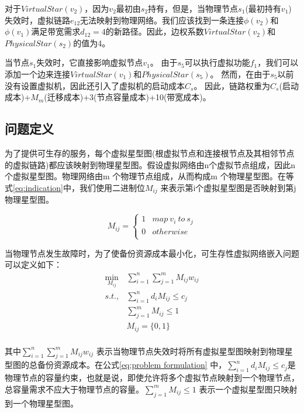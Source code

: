 对于$VirtualStar(v_2)$，因为$v_2$最初由$s_2$持有，但是，当物理节点$s_1$(最初持有$v_1$)失效时，虚拟链路$e_{12}$无法映射到物理网络。我们应该找到一条连接$\phi(v_2)$和$\phi(v_1)$满足带宽需求$d_{12}=4$的新路径。因此，边权系数$VirtualStar(v_2)$和$PhysicalStar(s_2)$的值为4。

当节点$s_1$失效时，它直接影响虚拟节点$v_1$。 由于$s_5$可以执行虚拟功能$f_1$，我们可以添加一个边来连接$VirtualStar(v_1)$和$PhysicalStar(s_5)$。 然而，在由于$s_5$以前没有设置虚拟机，因此还引入了虚拟机的启动成本$C_s$。 因此，链路权重为$C_s$(启动成本)+$M_m$(迁移成本)+3(节点容量成本)+10(带宽成本)。

\subsection{问题定义}
为了提供可生存的服务，每个虚拟星型图(根虚拟节点和连接根节点及其相邻节点的虚拟链路)都应该映射到物理星型图。假设虚拟网络由n个虚拟节点组成，因此n个虚拟星型图。物理网络由m 个物理节点组成，从而构成m 个物理星型图。在等式\ref{eq:indication}中，我们使用二进制位$M_{ij}$ 来表示第i个虚拟星型图是否映射到第j物理星型图。

\begin{equation}
{M_{ij}} = \left\{ {\begin{array}{*{20}{c}}
   1 & {map \ v_i \  to  \ s_j}  \\
   0 & {otherwise}  \\
\end{array}} \right.
\label{eq:indication}
\end{equation}

当物理节点发生故障时，为了使备份资源成本最小化，可生存性虚拟网络嵌入问题可以定义如下：
\begin{equation}
\begin{array}{*{20}{c}}
   {\mathop {\min }\limits_{{M_{ij}}} } & {\sum\limits_{i = 1}^n {\sum\limits_{j = 1}^m {{M_{ij}}{w_{ij}}} } }  \\
   {s.t.,} & {\sum\limits_{i = 1}^n {{d_i}{M_{ij}}}  \le {c_j}}  \\
   {} & {\sum\limits_{j = 1}^m {{M_{ij}}}  \le 1}  \\
   {} & {{M_{ij}} = \{ 0,1\} }  \\
\end{array}
\label{eq:problem formulation}
\end{equation}

其中${\sum\limits_{i = 1}^n {\sum\limits_{j = 1}^m {{M_{ij}}{w_{ij}}} } }$ 表示当物理节点失效时将所有虚拟星型图映射到物理星型图的总备份资源成本。在公式\ref{eq:problem formulation} 中，${\sum\limits_{i = 1}^n {{d_i}{M_{ij}}}  \le {c_j}}$是物理节点的容量约束，也就是说，即使允许将多个虚拟节点映射到一个物理节点，总容量需求不应大于物理节点的容量。${\sum\limits_{j = 1}^m {{M_{ij}}}  \le 1}$ 表示一个虚拟星型图只映射到一个物理星型图。

